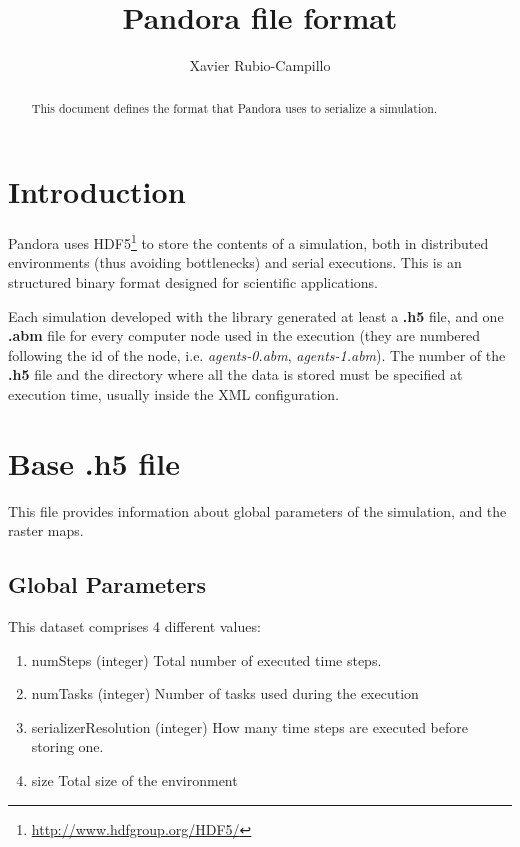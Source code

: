 \documentclass[a4paper,10pt]{article}
\title{Pandora file format}
\author{Xavier Rubio-Campillo}
\begin{document}
\maketitle

\begin{abstract}
This document defines the format that Pandora uses to serialize a simulation.
\end{abstract}

\section{Introduction}

Pandora uses HDF5\footnote{\url{http://www.hdfgroup.org/HDF5/}} to store the contents of a simulation, both in distributed environments (thus avoiding bottlenecks) and serial executions. This is an structured binary format designed for scientific applications.

Each simulation developed with the library generated at least a \textbf{.h5} file, and one \textbf{.abm} file for every computer node used in the execution (they are numbered following the id of the node, i.e. \textit{agents-0.abm}, \textit{agents-1.abm}). The number of the \textbf{.h5} file and the directory where all the data is stored must be specified at execution time, usually inside the XML configuration.

\section{Base \textbf{.h5} file}

This file provides information about global parameters of the simulation, and the raster maps.

\subsection{Global Parameters}

This dataset comprises 4 different values:


\begin{enumerate}
  \item numSteps (integer)
Total number of executed time steps.
  \item numTasks (integer)
Number of tasks used during the execution
  \item serializerResolution (integer)
How many time steps are executed before storing one.
  \item{size}
Total size of the environment
\end{enumerate}
\end{document}
